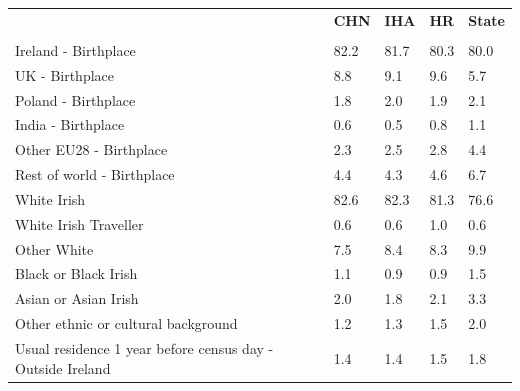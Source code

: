 \documentclass{article}
\begin{document}
\pagebreak
\begin{table}[h]	
\centering
		\begin{tabular}{KTTTT}
  \hline
& \textbf{CHN} & \textbf{IHA} & \textbf{HR}& \textbf{State}\\ 
  \hline
    \\ 
    \hline
Ireland - Birthplace & 82.2& 81.7& 80.3& 80.0\\
UK - Birthplace & 8.8& 9.1& 9.6& 5.7\\
Poland - Birthplace & 1.8& 2.0& 1.9& 2.1\\
India - Birthplace & 0.6& 0.5& 0.8& 1.1\\
Other EU28 - Birthplace & 2.3& 2.5& 2.8& 4.4\\
Rest of world - Birthplace & 4.4& 4.3& 4.6& 6.7\\
    \hline
White Irish & 82.6& 82.3& 81.3& 76.6\\
White Irish Traveller & 0.6& 0.6& 1.0& 0.6\\
Other White & 7.5& 8.4& 8.3& 9.9\\
Black or Black Irish & 1.1& 0.9& 0.9& 1.5\\
Asian or Asian Irish & 2.0& 1.8& 2.1& 3.3\\
Other ethnic or cultural background & 1.2& 1.3& 1.5& 2.0\\
    \hline
Usual residence 1 year before census day - Outside Ireland & 1.4& 1.4& 1.5& 1.8\\


\end{tabular}
\end{table}
\end{document}
